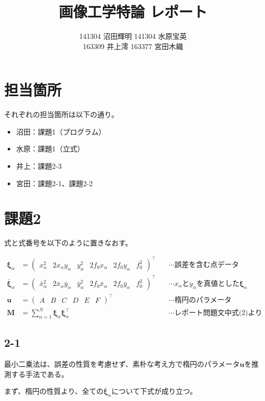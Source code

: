 \documentclass[12pt,a4j]{jsarticle}
\title{画像工学特論 レポート}
\author{141304 沼田輝明  141304 水原宝英 \\ 163309 井上澪  163377 宮田木織}
\newcommand{\xa}{x_\alpha}
\newcommand{\bxa}{\bar{x}_\alpha}
\newcommand{\ya}{y_\alpha}
\newcommand{\bya}{\bar{y}_\alpha}
\newcommand{\xia}{\bm{\xi}_\alpha}
\newcommand{\bxia}{\bar{\bm{\xi}}_\alpha}
\begin{document}
  \maketitle %
  \newpage

\section*{担当箇所}
  それぞれの担当箇所は以下の通り。
  \begin{itemize}
    \item 沼田：課題1（プログラム）
    \item 水原：課題1（立式）
    \item 井上：課題2-3
    \item 宮田：課題2-1、課題2-2
  \end{itemize}
  \newpage

\section*{課題2}
  式と式番号を以下のように置きなおす。

  \begin{align}
    \xia &= \begin{pmatrix}\xa^2 & 2\xa\ya & \ya^2 & 2f_0\xa & 2f_0\ya & f_0^2\end{pmatrix}^\top
     & \quad\cdots\text{誤差を含む点データ} \\
    \bxia &= \begin{pmatrix}\bxa^2 & 2\bxa\bya & \bya^2 & 2f_0\bxa & 2f_0\bya & f_0^2\end{pmatrix}^\top
     & \quad\cdots\text{$\xa$と$\ya$を真値とした$\xia$} \\
    \bm{u} &= \begin{pmatrix}A & B & C & D & E & F\end{pmatrix}^\top
     & \quad\cdots\text{楕円のパラメータ} \\
    \bm{M} &= \sum_{\alpha = 1}^N \xia \xia^\top
     & \quad\cdots\text{レポート問題文中式(2)より} \label{eq:M}
  \end{align}

  \subsection*{2-1}
  最小二乗法は、誤差の性質を考慮せず、素朴な考え方で楕円のパラメータ$\bm{u}$を推測する手法である。\par
  まず、楕円の性質より、全ての$\bxia$について下式が成り立つ。
\end{document}
